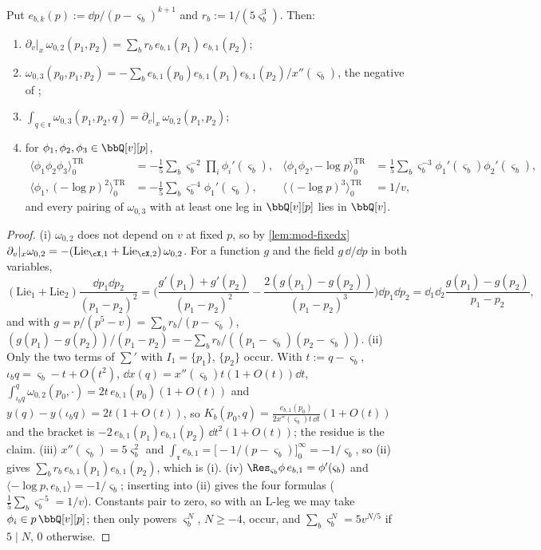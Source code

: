 \begin{lem}
\label{lem:mod-genus0}
Put $e_{b,k}(p):=\dd p/(p-\varsigma_b)^{k+1}$ and $r_b:=1/(5\varsigma_b^3)$. Then:
\begin{enumerate}
\item $\partial_v|_x\,\omega_{0,2}(p_1,p_2)=\sum_br_b\,e_{b,1}(p_1)\,e_{b,1}(p_2)$;
\item $\omega_{0,3}(p_0,p_1,p_2)=-\sum_be_{b,1}(p_0)e_{b,1}(p_1)e_{b,1}(p_2)/x''(\varsigma_b)$, the negative of \cite[Thm.~4.1 (4-20)]{Eynard:2007kz};
\item $\int_{q\in\mathfrak r}\omega_{0,3}(p_1,p_2,q)=\partial_v|_x\,\omega_{0,2}(p_1,p_2)$;
\item for $\phi_1,\phi_2,\phi_3\in\bbQ[v][p]$,
\[
\begin{aligned}
\langle\phi_1\phi_2\phi_3\rangle^{\mathrm{TR}}_0&=-\tfrac15\textstyle\sum_b\varsigma_b^{-2}\prod_i\phi_i'(\varsigma_b), &\langle\phi_1\phi_2,-\log p\rangle^{\mathrm{TR}}_0&=\tfrac15\textstyle\sum_b\varsigma_b^{-3}\phi_1'(\varsigma_b)\phi_2'(\varsigma_b),\\
\langle\phi_1,(-\log p)^2\rangle^{\mathrm{TR}}_0&=-\tfrac15\textstyle\sum_b\varsigma_b^{-4}\phi_1'(\varsigma_b), &\langle(-\log p)^3\rangle^{\mathrm{TR}}_0&=1/v,
\end{aligned}
\]
and every pairing of $\omega_{0,3}$ with at least one leg in $\bbQ[v][p]$ lies in $\bbQ[v]$.
\end{enumerate}
\end{lem}

\begin{proof}
(i) $\omega_{0,2}$ does not depend on $v$ at fixed $p$, so by \cref{lem:mod-fixedx} $\partial_v|_x\omega_{0,2}=-(\mathrm{Lie}_{\cX,1}+\mathrm{Lie}_{\cX,2})\,\omega_{0,2}$. For a function $g$ and the field $g\,\dd/\dd p$ in both variables,
\[
(\mathrm{Lie}_{1}+\mathrm{Lie}_{2})\frac{\dd p_1\dd p_2}{(p_1-p_2)^2}=\Big(\frac{g'(p_1)+g'(p_2)}{(p_1-p_2)^2}-\frac{2(g(p_1)-g(p_2))}{(p_1-p_2)^3}\Big)\dd p_1\dd p_2=\dd_1\dd_2\frac{g(p_1)-g(p_2)}{p_1-p_2},
\]
and with $g=p/(p^5-v)=\sum_br_b/(p-\varsigma_b)$, $(g(p_1)-g(p_2))/(p_1-p_2)=-\sum_br_b/((p_1-\varsigma_b)(p_2-\varsigma_b))$.
(ii) Only the two terms of ${\sum}'$ with $I_1=\{p_1\}$, $\{p_2\}$ occur. With $t:=q-\varsigma_b$, $\iota_bq=\varsigma_b-t+O(t^2)$, $\dd x(q)=x''(\varsigma_b)t(1+O(t))\dd t$, $\int_{\iota_bq}^q\omega_{0,2}(p_0,\cdot)=2t\,e_{b,1}(p_0)(1+O(t))$ and $y(q)-y(\iota_bq)=2t(1+O(t))$, so $K_b(p_0,q)=\frac{e_{b,1}(p_0)}{2x''(\varsigma_b)t\,\dd t}(1+O(t))$ and the bracket is $-2\,e_{b,1}(p_1)e_{b,1}(p_2)\,\dd t^2(1+O(t))$; the residue is the claim.
(iii) $x''(\varsigma_b)=5\varsigma_b^2$ and $\int_{\mathfrak r}e_{b,1}=\big[-1/(p-\varsigma_b)\big]_0^\infty=-1/\varsigma_b$, so (ii) gives $\sum_br_b\,e_{b,1}(p_1)e_{b,1}(p_2)$, which is (i).
(iv) $\Res_{\varsigma_b}\phi\,e_{b,1}=\phi'(\varsigma_b)$ and $\langle-\log p,e_{b,1}\rangle=-1/\varsigma_b$; inserting into (ii) gives the four formulas ($\frac15\sum_b\varsigma_b^{-5}=1/v$). Constants pair to zero, so with an L-leg we may take $\phi_i\in p\,\bbQ[v][p]$; then only powers $\varsigma_b^N$, $N\geq -4$, occur, and $\sum_b\varsigma_b^N=5v^{N/5}$ if $5\mid N$, $0$ otherwise.
\end{proof}

